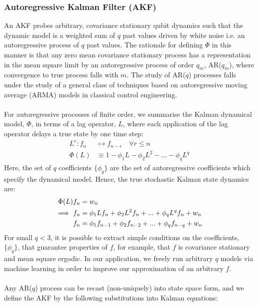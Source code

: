 \subsubsection{Autoregressive Kalman Filter (AKF)}
An AKF probes arbitrary, covariance stationary qubit dynamics such that the dynamic model is a weighted sum of $q$ past values driven by white noise i.e. an autoregressive process of $q$ past values. The rationale for defining $\Phi$ in this manner is that any zero mean covariance stationary process has a representation in the mean square limit by an autoregressive process of order $q_m$, AR($q_m$), where convergence to true process falls with $m$. The study of AR($q$) processes falls under the study of a general class of techniques based on autoregressive moving average (ARMA) models in classical control engineering. 
\\
\\
For autoregressive processes of finite order, we summarise the Kalman dynamical model, $\Phi$, in terms of a lag operator, $L$, where each application of the lag operator delays a true state by one time step:
\begin{align}
L^r: f_n &\mapsto f_{n-r} \quad \forall r \leq n \\
\Phi(L) & \equiv  1 - \phi_1 L - \phi_2 L^2 - ... - \phi_q L^q 
\end{align}
Here, the set of $q$ coefficients $\{ \phi_q \}$ are the set of autoregressive coefficients which specify the dynamical model. Hence, the true stochastic Kalman state dynamics are:
\begin{align}
\Phi(L) f_n & = w_n \\ 
\implies f_n & = \phi_1 L f_n + \phi_2 L^2 f_n + ... + \phi_q L^q f_n + w_n \\
 f_n &= \phi_1 f_{n-1} + \phi_2 f_{n-2} + ... + \phi_q f_{n-q} + w_n \label{eqn:main:ARprocess}
\end{align}
For small $q < 3$, it is possible to extract simple conditions on the coefficients, $\{ \phi_q \}$, that guarantee properties of $f$, for example, that $f$ is covariance stationary and mean square ergodic. In our application, we freely run arbitrary $q$ models via machine learning in order to improve our approximation of an arbitrary $f$.
\\
\\
Any AR($q$) process can be recast (non-uniquely) into state space form, and we define the AKF by the following substitutions into Kalman equations:
